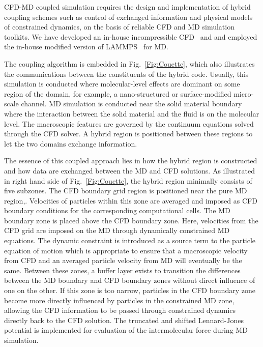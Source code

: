 \documentclass[conference,final]{IEEEtran}
\begin{document}
CFD-MD coupled simulation requires the design and implementation of hybrid coupling 
schemes such as control of exchanged information and physical models of constrained 
dynamics, on the basis of reliable CFD and MD simulation toolkits. We have developed an 
in-house incompressible CFD~\cite{Lee} and and employed the in-house modified version of 
LAMMPS~\cite{LAMMPS} for MD.

The coupling algorithm is embedded in Fig.~\ref{Fig:Couette}, which also illustrates the 
communications between the constituents of the hybrid code. Usually, this simulation is 
conducted where molecular-level effects are dominant on some region of the domain, for 
example, a nano-structured or surface-modified micro-scale channel. MD simulation is 
conducted near the solid material boundary where the interaction between the solid 
material and the fluid is on the molecular level. The macroscopic features are governed 
by the continuum equations solved through the CFD solver. A hybrid region is positioned 
between these regions to let the two domains exchange information.

The essence of this coupled approach lies in how the hybrid region is constructed and how 
data are exchanged between the MD and CFD solutions. As illustrated in right hand side of 
Fig.~\ref{Fig:Couette}, the hybrid region minimally consists of five subzones. The CFD 
boundary grid region is positioned near the pure MD region,. Velocities of particles 
within this zone are averaged and imposed as CFD boundary conditions for the 
corresponding computational cells. The MD boundary zone is placed above the CFD boundary 
zone. Here, velocities from the CFD grid are imposed on the MD through dynamically 
constrained MD equations. The dynamic constraint is introduced as a source term to the 
particle equation of motion which is appropriate to ensure that a macroscopic velocity 
from CFD and an averaged particle velocity from MD will eventually be the same. Between 
these zones, a buffer layer exists to transition the differences between the MD boundary 
and CFD boundary zones without direct influence of one on the other. If this zone is too 
narrow, particles in the CFD boundary zone become more directly influenced by particles 
in the constrained MD zone, allowing the CFD information to be passed through constrained 
dynamics directly back to the CFD solution. The truncated and shifted Lennard-Jones 
potential is implemented for evaluation of the intermolecular force during MD simulation.
\end{document}
